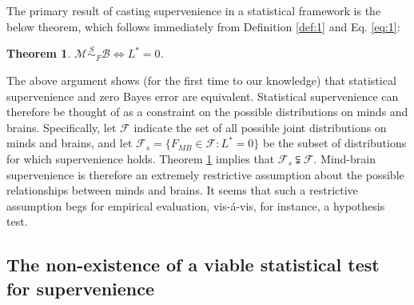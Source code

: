 \documentclass{article}
\newcommand{\mB}{\mathcal{B}}
\newcommand{\mM}{\mathcal{M}}
\newcommand{\PP}{\mathbb{P}}           %
\providecommand{\mc}[1]{\mathcal{#1}}
\newcommand{\MsB}{\mM \overset{S}{\sim}_{F} \mB}
\newtheorem{thm}{Theorem}
\begin{document}
The primary result of casting supervenience in a statistical framework is the below theorem, which 
follows immediately from Definition \ref{def:1} and Eq. \eqref{eq:1}: 
\begin{thm}
\label{thm:1} 
$\mM \overset{S}{\sim}_{F} \mB \Leftrightarrow L^*= 0$.
\end{thm}


The above argument shows (for the first time to our knowledge) that statistical supervenience and zero Bayes error are equivalent. Statistical supervenience can therefore be thought of as a constraint on the possible distributions on minds and brains.  Specifically, let $\mc{F}$ indicate the set of all possible joint distributions on minds and brains, and let $\mc{F}_s = \{F_{MB} \in \mc{F}: L^*=0\}$ be the subset of distributions for which supervenience holds. Theorem \ref{thm:1} implies that $\mc{F}_s  \subsetneqq \mc{F}$.  Mind-brain supervenience is therefore an extremely restrictive assumption about the possible relationships between minds and brains.  It seems that such a restrictive assumption begs for empirical evaluation, vis-\'a-vis, for instance, a hypothesis test.


\subsection*{The non-existence of a viable statistical test for supervenience} %
\label{sub:subsection_name}
\end{document}
